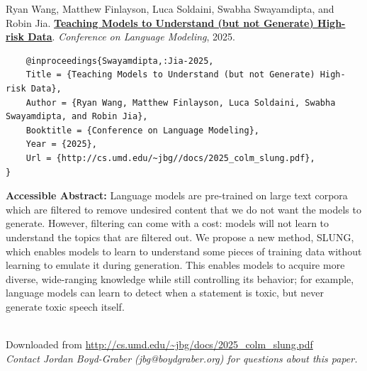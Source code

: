 \documentclass[a4paper]{article}
\begin{document}
    Ryan Wang, Matthew Finlayson, Luca Soldaini, Swabha Swayamdipta, and Robin Jia.  {\bf \href{http://cs.umd.edu/~jbg//docs/2025_colm_slung.pdf}{Teaching Models to Understand (but not Generate) High-risk Data}}.  \emph{Conference on Language Modeling}, 2025.



    \vspace{5cm}

    \begin{verbatim}
    @inproceedings{Swayamdipta,:Jia-2025,
	Title = {Teaching Models to Understand (but not Generate) High-risk Data},
	Author = {Ryan Wang, Matthew Finlayson, Luca Soldaini, Swabha Swayamdipta, and Robin Jia},
	Booktitle = {Conference on Language Modeling},
	Year = {2025},
	Url = {http://cs.umd.edu/~jbg//docs/2025_colm_slung.pdf},
}

    \end{verbatim}

    {\bf Accessible Abstract:} Language models are pre-trained on large text corpora which are filtered to remove undesired content that we do not want the models to generate. However, filtering can come with a cost: models will not learn to understand the topics that are filtered out. We propose a new method, SLUNG, which enables models to learn to understand some pieces of training data without learning to emulate it during generation. This enables models to acquire more diverse, wide-ranging knowledge while still controlling its behavior; for example, language models can learn to detect when a statement is toxic, but never generate toxic speech itself.\\~

    

    

    \vspace{3cm}
    Downloaded from \url{http://cs.umd.edu/~jbg/docs/2025_colm_slung.pdf}  \\

    \vspace{2cm}
    \textit{Contact Jordan Boyd-Graber (jbg@boydgraber.org) for questions about this paper.}

    

    
\end{document}
